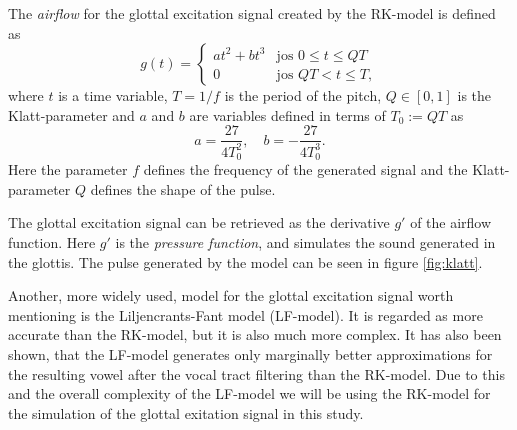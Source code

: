 \documentclass[12pt,a4]{article}
\begin{document}
The \emph{airflow} for the glottal excitation signal created by the RK-model is defined as
\begin{equation}
\label{eq:RK-model}
g(t) =
  \begin{cases}
   at^2 + bt^3  & \text{jos } 0 \leq t \leq Q T \\
   0            & \text{jos } Q T < t \leq T,
  \end{cases}
\end{equation}
where $t$ is a time variable, $T = 1/f$ is the period of the pitch, $Q \in \left[ 0,1 \right]$ is the Klatt-parameter and $a$ and $b$ are variables defined in terms of $T_0 := QT$ as
\begin{equation*}
a = \frac{27}{4 T_0^2}, \quad b = -\frac{27}{4 T_0^3} .
\end{equation*}
Here the parameter $f$ defines the frequency of the generated signal and the Klatt-parameter $Q$ defines the shape of the pulse.

The glottal excitation signal can be retrieved as the derivative $g'$ of the airflow function. Here $g'$ is the \emph{pressure function}, and simulates the sound generated in the glottis. The pulse generated by the model can be seen in figure \ref{fig:klatt}.

Another, more widely used, model for the glottal excitation signal worth mentioning is the Liljencrants-Fant model (LF-model).\cite{fant} It is regarded as more accurate than the RK-model, but it is also much more complex. It has also been shown, that the LF-model generates only marginally better approximations for the resulting vowel after the vocal tract filtering than the RK-model.\cite{fujisaki} Due to this and the overall complexity of the LF-model we will be using the RK-model for the simulation of the glottal exitation signal in this study.
\end{document}
